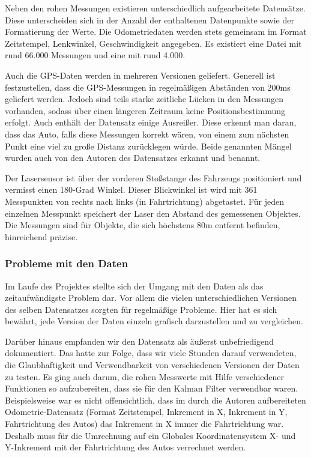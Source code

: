 \documentclass[11pt]{article}
\begin{document}
Neben den rohen Messungen existieren unterschiedlich aufgearbeitete Datensätze. Diese unterscheiden sich in der Anzahl der enthaltenen Datenpunkte sowie der Formatierung der Werte. Die Odometriedaten werden stets gemeinsam im Format {Zeitstempel, Lenkwinkel, Geschwindigkeit} angegeben. Es existiert eine Datei mit rund 66.000 Messungen und eine mit rund 4.000.

Auch die GPS-Daten werden in mehreren Versionen geliefert. Generell ist festzustellen, dass die GPS-Messungen in regelmäßigen Abständen von 200ms geliefert werden. Jedoch sind teils starke zeitliche Lücken in den Messungen vorhanden, sodass über einen längeren Zeitraum keine Positionsbestimmung erfolgt. Auch enthält der Datensatz einige Ausreißer. Diese erkennt man daran, dass das Auto, falls diese Messungen korrekt wären, von einem zum nächsten Punkt eine viel zu große Distanz zurücklegen würde. Beide genannten Mängel wurden auch von den Autoren des Datensatzes erkannt und benannt.

Der Lasersensor ist über der vorderen Stoßstange des Fahrzeugs positioniert und vermisst einen 180-Grad Winkel. Dieser Blickwinkel ist wird mit 361 Messpunkten von rechts nach links (in Fahrtrichtung) abgetastet. Für jeden einzelnen Messpunkt speichert der Laser den Abstand des gemessenen Objektes. Die Messungen sind für Objekte, die sich höchstens 80m entfernt befinden, hinreichend präzise.

\subsubsection{Probleme mit den Daten}
Im Laufe des Projektes stellte sich der Umgang mit den Daten als das zeitaufwändigste Problem dar. Vor allem die vielen unterschiedlichen Versionen des selben Datensatzes sorgten für regelmäßige Probleme. Hier hat es sich bewährt, jede Version der Daten einzeln grafisch darzustellen und zu vergleichen.

Darüber hinaus empfanden wir den Datensatz als äußerst unbefriedigend dokumentiert. Das hatte zur Folge, dass wir viele Stunden darauf verwendeten, die Glaubhaftigkeit und Verwendbarkeit von verschiedenen Versionen der Daten zu testen. Es ging auch darum, die rohen Messwerte mit Hilfe verschiedener Funktionen so aufzubereiten, dass sie für den Kalman Filter verwendbar waren. Beispielsweise war es nicht offensichtlich, dass im durch die Autoren aufbereiteten Odometrie-Datensatz (Format {Zeitstempel, Inkrement in X, Inkrement in Y, Fahrtrichtung des Autos}) das Inkrement in X immer die Fahrtrichtung war. Deshalb muss für die Umrechnung auf ein Globales Koordinatensystem X- und Y-Inkrement mit der Fahrtrichtung des Autos verrechnet werden. 
\end{document}

